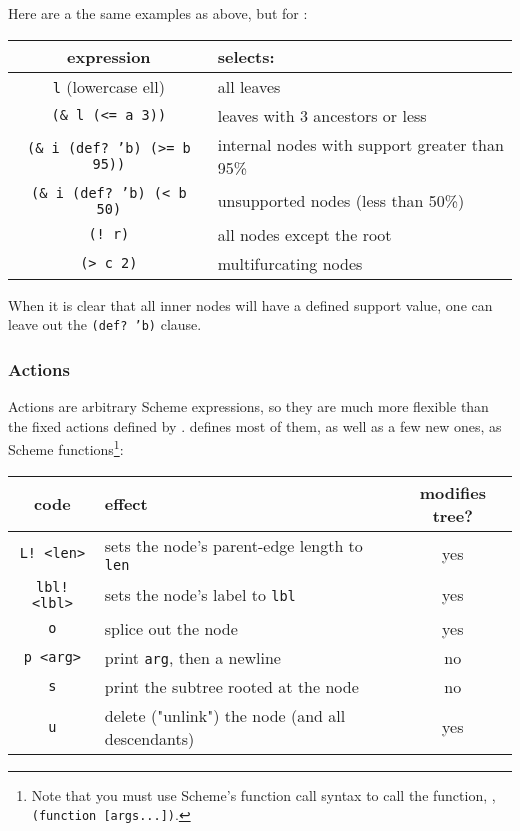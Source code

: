 \noindent{}Here are a the same examples as above, but for \sched:

\begin{center}
\begin{tabular}{cl}
expression & selects: \\
\hline
\texttt{l} (lowercase ell) & all leaves \\
\texttt{(\& l (<= a 3))} & leaves with 3 ancestors or less \\
\texttt{(\& i (def? 'b) (>= b 95))} & internal nodes with support greater than 95\% \\ 
\texttt{(\& i (def? 'b) (< b 50)} & unsupported nodes (less than 50\%) \\
\texttt{(! r)} & all nodes except the root \\
\texttt{(> c 2)} & multifurcating nodes
\end{tabular}
\end{center}

\noindent{}When it is clear that all inner nodes will have a defined support
value, one can leave out the \texttt{(def? 'b)} clause.

\subsubsection{Actions}

Actions are arbitrary Scheme expressions, so they are much more flexible than
the fixed actions defined by \ed. \sched{} defines most of them, as well as a
few new ones, as Scheme functions\footnote{Note that you must use Scheme's function call syntax to call the function, \ie, \texttt{(function [args...])}.}:

\begin{center}
\begin{tabular}{clc}
code & effect & modifies tree?\\
\hline
\texttt{L! <len>}	& sets the node's parent-edge length to \texttt{len}	& yes \\
\texttt{lbl! <lbl>}	& sets the node's label to \texttt{lbl}	& yes \\
\texttt{o} 				& splice out the node 									& yes \\
\texttt{p <arg>} 	& print \texttt{arg}, then a newline 		& no \\
\texttt{s} 				& print the subtree rooted at the node 	& no \\
\texttt{u} 				& delete ("unlink") the node (and all descendants) & yes \\
\end{tabular}
\end{center}

